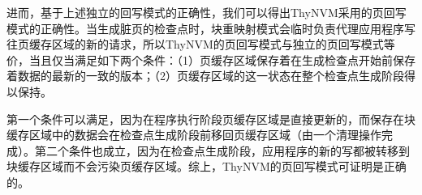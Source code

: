 进而，基于上述独立的回写模式的正确性，我们可以得出ThyNVM采用的页回写模式的正确性。当生成脏页的检查点时，块重映射模式会临时负责代理应用程序写往页缓存区域的新的请求，所以ThyNVM的页回写模式与独立的页回写模式等价，当且仅当满足如下两个条件：（1）页缓存区域保存着在生成检查点开始前保存着数据的最新的一致的版本；（2）页缓存区域的这一状态在整个检查点生成阶段得以保持。

第一个条件可以满足，因为在程序执行阶段页缓存区域是直接更新的，而保存在块缓存区域中的数据会在检查点生成阶段前移回页缓存区域（由一个清理操作完成）。第二个条件也成立，因为在检查点生成阶段，应用程序的新的写都被转移到块缓存区域而不会污染页缓存区域。综上，ThyNVM的页回写模式可证明是正确的。
